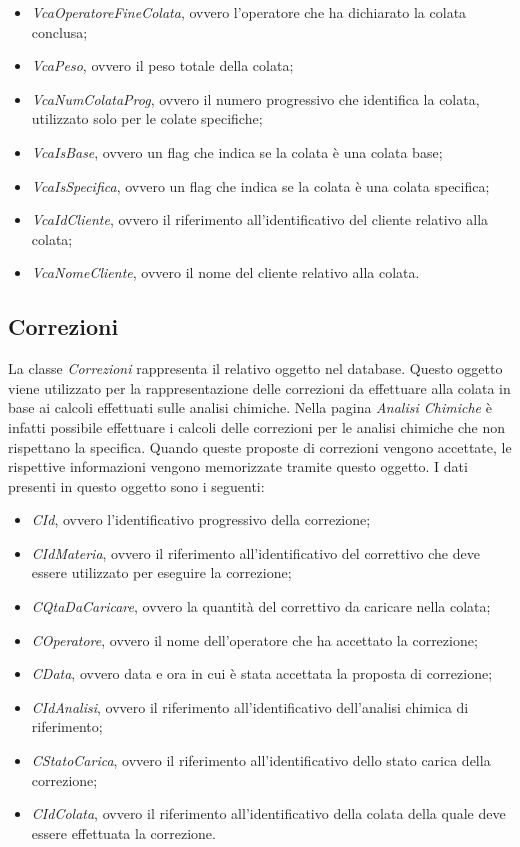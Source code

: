 \begin{itemize}
    \item \textit{VcaOperatoreFineColata}, ovvero l'operatore che ha dichiarato la colata conclusa;
    \item \textit{VcaPeso}, ovvero il peso totale della colata;
    \item \textit{VcaNumColataProg}, ovvero il numero progressivo che identifica la colata, utilizzato solo per
    le colate specifiche;
    \item \textit{VcaIsBase}, ovvero un flag che indica se la colata è una colata base;
    \item \textit{VcaIsSpecifica}, ovvero un flag che indica se la colata è una colata specifica;
    \item \textit{VcaIdCliente}, ovvero il riferimento all'identificativo del cliente relativo alla colata;
    \item \textit{VcaNomeCliente}, ovvero il nome del cliente relativo alla colata.
  \end{itemize}
  
  \subsection{Correzioni}
  La classe \textit{Correzioni} rappresenta il relativo oggetto nel database. Questo oggetto viene utilizzato per la
  rappresentazione delle correzioni da effettuare alla colata in base ai calcoli effettuati sulle analisi chimiche.
  Nella pagina \textit{Analisi Chimiche} è infatti possibile effettuare i calcoli delle correzioni per le analisi chimiche
  che non rispettano la specifica. Quando queste proposte di correzioni vengono accettate, le rispettive informazioni vengono
  memorizzate tramite questo oggetto. I dati presenti in questo oggetto sono i seguenti:
  \begin{itemize}
      \item \textit{CId}, ovvero l'identificativo progressivo della correzione;
      \item \textit{CIdMateria}, ovvero il riferimento all'identificativo del correttivo che deve essere
      utilizzato per eseguire la correzione;
      \item \textit{CQtaDaCaricare}, ovvero la quantità del correttivo da caricare nella colata;
      \item \textit{COperatore}, ovvero il nome dell'operatore che ha accettato la correzione;
      \item \textit{CData}, ovvero data e ora in cui è stata accettata la proposta di correzione;
      \item \textit{CIdAnalisi}, ovvero il riferimento all'identificativo dell'analisi chimica di riferimento;
      \item \textit{CStatoCarica}, ovvero il riferimento all'identificativo dello stato carica della correzione;
      \item \textit{CIdColata}, ovvero il riferimento all'identificativo della colata della quale deve essere
      effettuata la correzione.
  \end{itemize}

